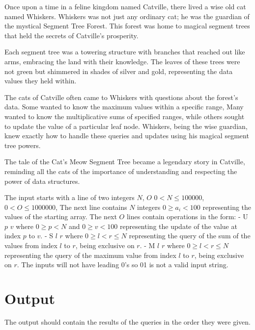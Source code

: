 Once upon a time in a feline kingdom named Catville, there lived a wise old cat named Whiskers. Whiskers was not just any ordinary cat; he was the guardian of the mystical Segment Tree Forest. This forest was home to magical segment trees that held the secrets of Catville's prosperity.

Each segment tree was a towering structure with branches that reached out like arms, embracing the land with their knowledge. The leaves of these trees were not green but shimmered in shades of silver and gold, representing the data values they held within.

The cats of Catville often came to Whiskers with questions about the forest's data. Some wanted to know the maximum values within a specific range, Many wanted to know the multiplicative sums of specified ranges, while others sought to update the value of a particular leaf node. Whiskers, being the wise guardian, knew exactly how to handle these queries and updates using his magical segment tree powers.

The tale of the Cat's Meow Segment Tree became a legendary story in Catville, reminding all the cats of the importance of understanding and respecting the power of data structures.
{\setlength{\parindent}{0cm}
}
\begin{Input}
The input starts with a line of two integers $N$, $O$
{\setlength{\parindent}{0cm}
$0 < N \leq 100 000$,
$0 < O \leq 1 000 000$, 
The next line contains $N$ integers $0 \geq a_i < 100$ representing the values of the starting array.  
The next $O$ lines contain operations in the form:
    - U $p$ $v$ where $0 \geq p < N$ and $0 \geq v < 100$ representing the update of the value at index $p$ to $v$.
    - S $l$ $r$ where $0 \geq l < r \leq N$ representing the query of the sum of the values from index $l$ to $r$, being exclusive on $r$.
    - M $l$ $r$ where $0 \geq l < r \leq N$ representing the query of the maximum value from index $l$ to $r$, being exclusive on $r$.
}
{\setlength{\parindent}{0cm}
The inputs will not have leading 0's so 01 is not a valid input string.
}
\end{Input}

\section*{Output}
The output should contain the results of the queries in the order they were given. 
{\setlength{\parindent}{0cm}
}
